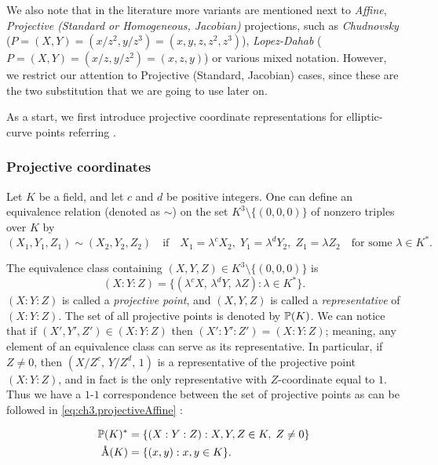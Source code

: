 We also note that in the literature more variants are mentioned next to \textit{Affine}, \textit{Projective (Standard or Homogeneous, Jacobian)} projections, such as \textit{Chudnovsky} ($P = (X,Y) = (x/z^2, y/z^3) = (x,y,z,z^2,z^3)$), \textit{Lopez-Dahab} ($P = (X,Y) = (x/z, y/z^2) = (x,z,y)$) or various mixed notation. However, we restrict our attention to Projective (Standard, Jacobian) cases, since these are the two substitution that we are going to use later on.

As a start,  we first introduce projective coordinate representations for elliptic-curve points referring \cite{theory.pairings.for.beginners,menezes2004ECC}.

\subsubsection{Projective coordinates}

Let $K$ be a field, and let $c$ and $d$ be positive integers. One can define an equivalence
relation (denoted as $\sim$) on the set $K^3 \setminus \{(0,0,0)\}$ of nonzero triples over $K$ by
\begin{equation}
	(X_1, Y_1, Z_1) \sim (X_2, Y_2, Z_2) \quad \text{if} \quad
	X_1 = \lambda^c X_2, \; Y_1 = \lambda^d Y_2, \; Z_1 = \lambda Z_2
	\quad \text{for some } \lambda \in K^*.
	\label{eq:ch3.equivalenceRelation}
\end{equation}

The equivalence class containing $(X, Y, Z) \in K^3 \setminus \{(0,0,0)\}$ is
\begin{equation}
	(X : Y : Z) = \{ (\lambda^c X,\, \lambda^d Y,\, \lambda Z) : \lambda \in K^* \}.
	\label{eq:ch3.equivalenceClass}
\end{equation}
$(X : Y : Z)$ is called a \textit{projective point}, and $(X, Y, Z)$ is called a
\textit{representative} of $(X : Y : Z)$. The set of all projective points is denoted by
${\mathbb{P}}(K)$. We can notice that if $(X', Y', Z') \in (X : Y : Z)$ then $(X' : Y' : Z') = (X : Y : Z)$;
meaning, any element of an equivalence class can serve as its representative. In particular,
if $Z \neq 0$, then $(X/Z^c,\, Y/Z^d,\, 1)$ is a representative of the projective point
$(X : Y : Z)$, and in fact is the only representative with $Z$-coordinate equal to $1$.
Thus we have a $1$-$1$ correspondence between the set of projective points as can be followed in \ref{eq:ch3.projectiveAffine} : 


\begin{align}
	\mathbb{P}(K)^* &= \{(X : Y : Z) : X, Y, Z \in K,\; Z \neq 0\} \label{eq:ch3.projectiveAffine}\\
	\AA(K)   &= \{(x, y) : x, y \in K\}. \label{eq:ch3.affinePoints}
\end{align}

